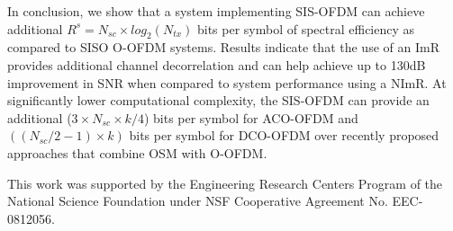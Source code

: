\documentclass[12pt,letterpaper,onecolumn]{article} %
\begin{document}
In conclusion, we show that a system implementing SIS-OFDM can achieve additional $R^s=N_{sc}\times log_2(N_{tx})$ bits per symbol of spectral efficiency as compared to SISO O-OFDM systems. Results indicate that the use of an ImR provides additional channel decorrelation and can help achieve up to 130dB improvement in SNR when compared to system performance using a NImR. At significantly lower computational complexity, the SIS-OFDM can provide an additional ($3\times N_{sc}\times k/4$) bits per symbol for ACO-OFDM and $((N_{sc}/2 -1)\times k)$ bits per symbol for DCO-OFDM over recently proposed approaches that combine OSM with O-OFDM.

This work was supported by the Engineering Research Centers Program of the National Science Foundation under NSF Cooperative Agreement No. EEC-0812056.


\end{document}
